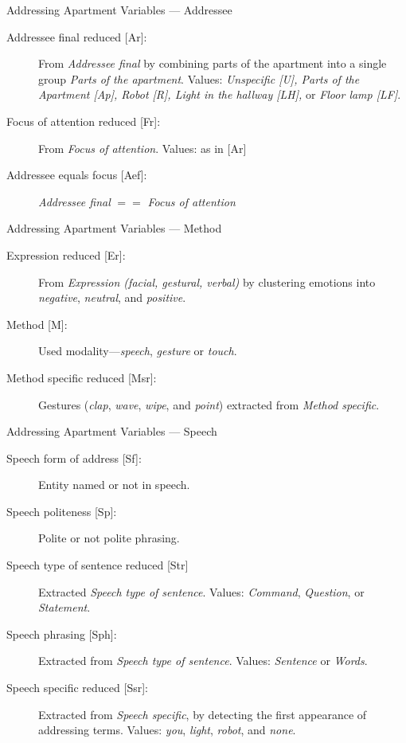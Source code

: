  \begin{frame}{Addressing Apartment Variables --- Addressee}
  \begin{description}
      \item[{Addressee final reduced [Ar]:}] From \emph{Addressee final} by combining parts of the \gls{apartment} into a single group \emph{Parts of the apartment}.
      Values: \emph{Unspecific [U], Parts of the Apartment [Ap], Robot [R], Light in the hallway [LH], } or \emph{Floor lamp [LF]}.
      \item[{Focus of attention reduced [Fr]:}] From \emph{Focus of attention}.
      Values: as in [Ar]
      \item[{Addressee equals focus [Aef]:}] \emph{Addressee final} \(==\) \emph{Focus of attention}
  \end{description}
\end{frame}
\begin{frame}{Addressing Apartment Variables --- Method}
  \begin{description}
      \item[{Expression reduced [Er]:}] From \emph{Expression (facial, gestural, verbal)} by clustering emotions into \emph{negative}, \emph{neutral}, and \emph{positive}.
      \item[{Method [M]:}] Used modality---\emph{speech}, \emph{gesture} or \emph{touch}.
      \item[{Method specific reduced [Msr]:}] Gestures (\emph{clap}, \emph{wave}, \emph{wipe}, and \emph{point}) extracted from \emph{Method specific}.
  \end{description}
\end{frame}
\begin{frame}{Addressing Apartment Variables --- Speech}
  \begin{description}
      \item[{Speech form of address [Sf]:}] Entity named or not in speech.
      \item[{Speech politeness [Sp]:}] Polite or not polite phrasing.
      \item[{Speech type of sentence reduced [Str]}] Extracted \emph{Speech type of sentence}.
      Values: \emph{Command}, \emph{Question}, or \emph{Statement}. 
      \item[{Speech phrasing [Sph]:}] Extracted from \emph{Speech type of sentence}.
      Values: \emph{Sentence} or \emph{Words}.
      \item[{Speech specific reduced [Ssr]:}] Extracted from \emph{Speech specific}, by detecting the first appearance of addressing terms.
      Values: \emph{you}, \emph{light}, \emph{robot}, and \emph{none}.
  \end{description}
\end{frame}

